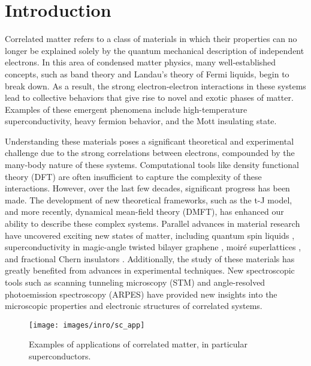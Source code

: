 \cleardoublepage
{}
\renewcommand{\chaptercolor}{epfl_dark_red}
\chapter*{Introduction}


Correlated matter refers to a class of materials in which their properties can no longer be explained solely by the quantum mechanical description of independent electrons.
In this area of condensed matter physics, many well-established concepts, such as band theory \cite{bethe_theorie_1928,sommerfeld_zur_1928,bloch_bemerkung_1929} and Landau’s theory of Fermi liquids, begin to break down.
As a result, the strong electron-electron interactions in these systems lead to collective behaviors that give rise to novel and exotic phases of matter.
Examples of these emergent phenomena include high-temperature superconductivity, heavy fermion behavior, and the Mott insulating state.

Understanding these materials poses a significant theoretical and experimental challenge due to the strong correlations between electrons, compounded by the many-body nature of these systems.
Computational tools like density functional theory (DFT) are often insufficient to capture the complexity of these interactions.
However, over the last few decades, significant progress has been made.
The development of new theoretical frameworks, such as the t-J model, and more recently, dynamical mean-field theory (DMFT), has enhanced our ability to describe these complex systems.
Parallel advances in material research have uncovered exciting new states of matter, including quantum spin liquids \cite{broholm_quantum_2020}, superconductivity in magic-angle twisted bilayer graphene \cite{oh_evidence_2021}, moiré superlattices \cite{andrei_marvels_2021}, and fractional Chern insulators \cite{zeng_thermodynamic_2023}.
Additionally, the study of these materials has greatly benefited from advances in experimental techniques.
New spectroscopic tools such as scanning tunneling microscopy (STM) and angle-resolved photoemission spectroscopy (ARPES) have provided new insights into the microscopic properties and electronic structures of correlated systems.
\begin{figure}
	\centering
	\texttt{[image: images/inro/sc\_app]}
	\caption{Examples of applications of correlated matter, in particular superconductors.}
	\label{fig:scapp}
\end{figure}

